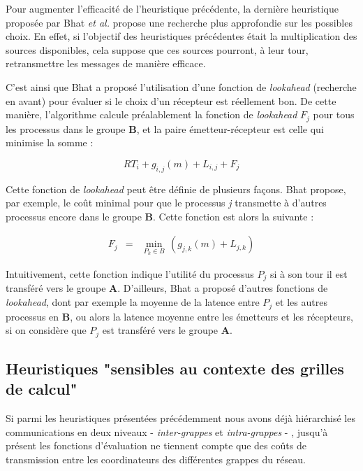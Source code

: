Pour augmenter l'efficacité de l'heuristique précédente, la dernière
heuristique proposée par Bhat \emph{et al.} \cite{Bhat03} propose
une recherche plus approfondie sur les possibles choix. En effet,
si l'objectif des heuristiques précédentes était la multiplication
des sources disponibles, cela suppose que ces sources pourront, à
leur tour, retransmettre les messages de manière efficace.

C'est ainsi que Bhat a proposé l'utilisation d'une fonction de \emph{lookahead}
(recherche en avant) pour évaluer si le choix d'un récepteur est réellement
bon. De cette manière, l'algorithme calcule préalablement la fonction
de \emph{lookahead} $F_{j}$ pour tous les processus dans le groupe
\textbf{B}, et la paire émetteur-récepteur est celle qui minimise
la somme :

\[
RT_{i}+g_{i,j}(m)+L_{i,j}+F_{j}\]


Cette fonction de \emph{lookahead} peut être définie de plusieurs
façons. Bhat \cite{Bhat03} propose, par exemple, le coût minimal
pour que le processus \emph{j} transmette à d'autres processus encore
dans le groupe \textbf{B}. Cette fonction est alors la suivante :

\begin{eqnarray*}
	F_{j} & = & \min_{P_{k}\in B}\,(g_{j,k}(m)+L_{j,k})\end{eqnarray*}


Intuitivement, cette fonction indique l'utilité du processus $P_{j}$
si à son tour il est transféré vers le groupe \textbf{A}. D'ailleurs,
Bhat a proposé d'autres fonctions de \emph{lookahead}, dont par exemple
la moyenne de la latence entre $P_{j}$ et les autres processus en
\textbf{B}, ou alors la latence moyenne entre les émetteurs et les
récepteurs, si on considère que $P_{j}$ est transféré vers le groupe
\textbf{A}. 


\subsection*{Heuristiques "sensibles au contexte des grilles de calcul"}

Si parmi les heuristiques présentées précédemment nous avons déjà
hiérarchisé les communications en deux niveaux - \emph{inter-grappes}
et \emph{intra-grappes} - , jusqu'à présent les fonctions d'évaluation
ne tiennent compte que des coûts de transmission entre les coordinateurs
des différentes grappes du réseau.


